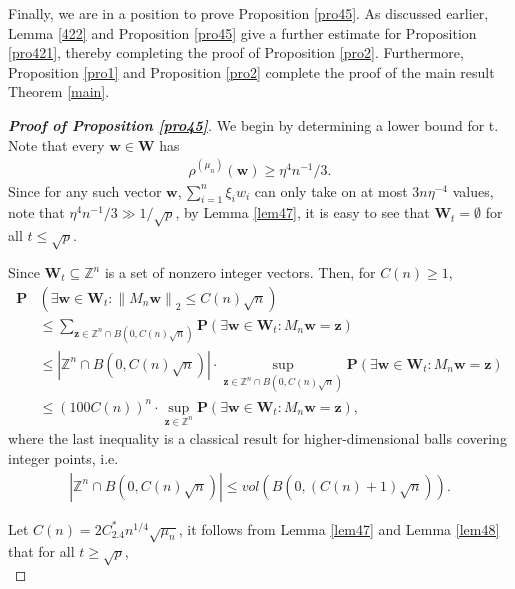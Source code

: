 \documentclass{article}
\numberwithin{equation}{section}
\theoremstyle{plain}
\begin{document}
Finally, we are in a position to prove Proposition \ref{pro45}. As discussed earlier, Lemma \ref{422} and Proposition \ref{pro45} give a further estimate for Proposition \ref{pro421}, thereby completing the proof of Proposition \ref{pro2}. Furthermore, Proposition \ref{pro1} and Proposition \ref{pro2} complete the proof of the main result Theorem \ref{main}.

\begin{proof}[\bf Proof of Proposition \ref{pro45}]
We begin by determining a lower bound for t. Note that every $\boldsymbol{w} \in \boldsymbol{W}$ has
\begin{align*}
\rho^{(\mu_{n})}(\boldsymbol{w}) \geq \eta^4 n^{-1} / 3.
\end{align*}
Since for any such vector $\boldsymbol{w}, \sum_{i=1}^n \xi_i w_i$ can only take on at most $3 n \eta^{-4}$ values, note that $\eta^4 n^{-1} / 3 \gg 1 / \sqrt{p}$, by Lemma \ref{lem47}, it is easy to see that $\boldsymbol{W}_t=\emptyset$ for all $t \leq \sqrt{p}$.
\par
Since $\boldsymbol{W}_t \subseteq \mathbb{Z}^n$ is a set of nonzero integer vectors. Then, for $C(n) \geq 1$,
\begin{align*}
\textbf{P}&\left(\exists \boldsymbol{w} \in \boldsymbol{W}_t:\left\|M_n \boldsymbol{w}\right\|_2 \leq C(n) \sqrt{n}\right)\\
& \leq \sum_{\boldsymbol{z} \in \mathbb{Z}^n \cap B(0, C(n) \sqrt{n})} \textbf{P}\left(\exists \boldsymbol{w} \in \boldsymbol{W}_t: M_n \boldsymbol{w}=\boldsymbol{z}\right) \\
& \leq\left|\mathbb{Z}^n \cap B(0, C(n) \sqrt{n})\right| \cdot \sup _{\boldsymbol{z} \in \mathbb{Z}^n \cap B(0, C(n) \sqrt{n})} \textbf{P}\left(\exists \boldsymbol{w} \in \boldsymbol{W}_t: M_n \boldsymbol{w}=\boldsymbol{z}\right) \\
& \leq(100 C(n))^n \cdot \sup _{\boldsymbol{z} \in \mathbb{Z}^n} \textbf{P}\left(\exists \boldsymbol{w} \in \boldsymbol{W}_t: M_n \boldsymbol{w}=\boldsymbol{z}\right),
\end{align*}
where the last inequality is a classical result for higher-dimensional balls covering integer points, i.e. 
\begin{align*}
\left|\mathbb{Z}^n \cap B(0, C(n) \sqrt{n})\right|\le vol(B(0, (C(n)+1) \sqrt{n})).
\end{align*}
\par
Let $C(n)=2 C^*_{2.4} n^{1 / 4}\sqrt{\mu_{n}}$, it follows from Lemma \ref{lem47} and Lemma \ref{lem48} that for all $t \geq \sqrt{p}$,
\\

\end{proof}
\end{document}
